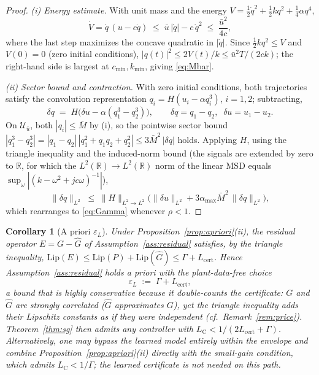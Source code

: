 \documentclass[11pt,sagev,times]{sagej}
\newtheorem{corollary}{Corollary}
\newcommand{\Ltwo}{L^2}
\newcommand{\Ghat}{\hat{G}}
\newcommand{\Lhat}{L_{\mathrm{cert}}}
\newcommand{\epsL}{\varepsilon_L}
\newcommand{\LC}{L_{\mathrm{C}}}
\begin{document}
\begin{proof}
\emph{(i) Energy estimate.} With unit mass and the energy
$V=\tfrac12\dot q^2+\tfrac12kq^2+\tfrac14\alpha q^4$,
\begin{equation}
  \dot V = \dot q\,(u-c\dot q) \;\le\; \bar u\,|\dot q| - c\,\dot q^2
  \;\le\; \frac{\bar u^2}{4c},
\end{equation}
where the last step maximizes the concave quadratic in $|\dot q|$. Since
$\tfrac12 kq^2\le V$ and $V(0)=0$ (zero initial conditions),
$|q(t)|^2\le 2V(t)/k \le \bar u^2T/(2ck)$; the right-hand side is largest
at $c_{\min},k_{\min}$, giving \eqref{eq:Mbar}.

\emph{(ii) Sector bound and contraction.} With zero initial conditions,
both trajectories satisfy the convolution representation
$q_i=H(u_i-\alpha q_i^3)$, $i=1,2$; subtracting,
\begin{equation}
  \delta q \;=\; H\big(\delta u-\alpha(q_1^3-q_2^3)\big),
  \qquad \delta q = q_1-q_2,\;\; \delta u = u_1-u_2 .
\end{equation}
On $\mathcal{U}_{\bar u}$, both $|q_i|\le\bar M$ by (i), so the pointwise
sector bound
$|q_1^3-q_2^3|=|q_1-q_2|\,|q_1^2+q_1q_2+q_2^2|\le 3\bar M^2\,|\delta q|$
holds. Applying $H$, using the triangle inequality and the induced-norm
bound (the signals are extended by zero to $\mathbb{R}$, for which the
$\Ltwo(\mathbb{R})\to\Ltwo(\mathbb{R})$ norm of the linear MSD equals
$\sup_\omega|(k-\omega^2+jc\omega)^{-1}|$),
\begin{equation}
  \|\delta q\|_{\Ltwo}
  \;\le\; \|H\|_{\Ltwo\to\Ltwo}\big(\|\delta u\|_{\Ltwo}
  + 3\alpha_{\max}\bar M^2\,\|\delta q\|_{\Ltwo}\big),
\end{equation}
which rearranges to \eqref{eq:Gamma} whenever $\rho<1$.
\end{proof}

\begin{corollary}[A priori $\epsL$]\label{cor:apriori}
Under Proposition~\ref{prop:apriori}(ii), the residual operator
$E=G-\Ghat$ of Assumption~\ref{ass:residual} satisfies, by the triangle
inequality,
$\mathrm{Lip}(E)\le\mathrm{Lip}(P)+\mathrm{Lip}(\Ghat)\le\Gamma+\Lhat$.
Hence Assumption~\ref{ass:residual} holds \emph{a priori} with the
plant-data-free choice
\begin{equation}
  \epsL \;:=\; \Gamma + \Lhat ,
  \label{eq:epsL-apriori}
\end{equation}
a bound that is \emph{highly conservative} because it double-counts the
certificate: $G$ and $\Ghat$ are strongly correlated ($\Ghat$ approximates
$G$), yet the triangle inequality adds their Lipschitz constants as if
they were independent (cf.\ Remark~\ref{rem:price}).
Theorem~\ref{thm:sg} then admits any controller with
$\LC<1/(2\Lhat+\Gamma)$. Alternatively, one may bypass the learned model
entirely within the envelope and combine
Proposition~\ref{prop:apriori}(ii) directly with the small-gain condition,
which admits $\LC<1/\Gamma$; the learned certificate is not needed on this
path.
\end{corollary}
\end{document}
